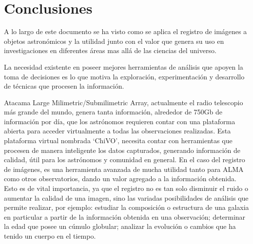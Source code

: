 \section{Conclusiones}

A lo largo de este documento se ha visto como se aplica el registro de
imágenes a objetos astronómicos y la utilidad junto con el valor que
genera su uso en investigaciones en diferentes áreas mas allá de las
ciencias del universo.

%
%
La necesidad existente en poseer mejores herramientas de análisis que
apoyen la toma de decisiones es lo que motiva la exploración,
experimentación y desarrollo de técnicas que procesen la información.

Atacama Large Milimetric/Submilimetric Array, actualmente el radio
telescopio más grande del mundo, genera tanta información, alrededor
de 750Gb de información por día, que los astrónomos requieren contar
con una plataforma abierta para acceder virtualmente a todas las
observaciones realizadas. Esta plataforma virtual nombrada ‘ChiVO’,
necesita contar con herramientas que procesen de manera inteligente
los datos capturados, generando información de calidad, útil para los
astrónomos y comunidad en general. En el caso del registro de
imágenes, es una herramienta avanzada de mucha utilidad tanto para
ALMA como otros observatorios, dando un valor agregado a la
información obtenida. Esto es de vital importancia, ya que el registro
no es tan solo disminuir el ruido o aumentar la calidad de una imagen,
sino las variadas posibilidades de análisis que permite realizar, por
ejemplo: estudiar la composición o estructura de una galaxia en
particular a partir de la información obtenida en una observación;
determinar la edad que posee un cúmulo globular; analizar la
evolución o cambios que ha tenido un cuerpo en el tiempo. 

